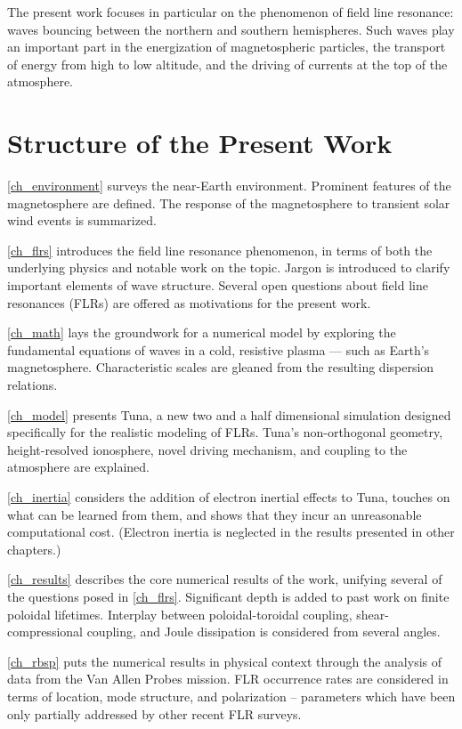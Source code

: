 The present work focuses in particular on the phenomenon of field line resonance: \Alfven waves bouncing between the northern and southern hemispheres. Such waves play an important part in the energization of magnetospheric particles, the transport of energy from high to low altitude, and the driving of currents at the top of the atmosphere. 

\section{Structure of the Present Work}

\cref{ch_environment} surveys the near-Earth environment. Prominent features of the magnetosphere are defined. The response of the magnetosphere to transient solar wind events is summarized. 

\cref{ch_flrs} introduces the field line resonance phenomenon, in terms of both the underlying physics and notable work on the topic. Jargon is introduced to clarify important elements of wave structure. Several open questions about field line resonances (FLRs) are offered as motivations for the present work. 

\cref{ch_math} lays the groundwork for a numerical model by exploring the fundamental equations of waves in a cold, resistive plasma --- such as Earth's magnetosphere. Characteristic scales are gleaned from the resulting dispersion relations. 

\cref{ch_model} presents Tuna, a new two and a half dimensional simulation designed specifically for the realistic modeling of FLRs. Tuna's non-orthogonal geometry, height-resolved ionosphere, novel driving mechanism, and coupling to the atmosphere are explained. 

\cref{ch_inertia} considers the addition of electron inertial effects to Tuna, touches on what can be learned from them, and shows that they incur an unreasonable computational cost. (Electron inertia is neglected in the results presented in other chapters.)

\cref{ch_results} describes the core numerical results of the work, unifying several of the questions posed in \cref{ch_flrs}. Significant depth is added to past work on finite poloidal lifetimes\cite{mann_1995,radoski_1974}. Interplay between poloidal-toroidal coupling, shear-compressional coupling, and Joule dissipation is considered from several angles. 

\cref{ch_rbsp} puts the numerical results in physical context through the analysis of data from the Van Allen Probes mission. FLR occurrence rates are considered in terms of location, mode structure, and polarization -- parameters which have been only partially addressed by other recent FLR surveys\cite{dai_2015,motoba_2015}. 

